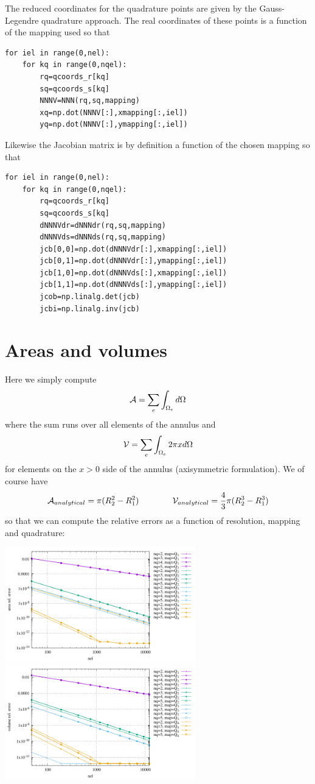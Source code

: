 The reduced coordinates for the quadrature points are given by 
the Gauss-Legendre quadrature approach. The real coordinates of these points
is a function of the mapping used so that 
\begin{lstlisting}
for iel in range(0,nel):
    for kq in range(0,nqel):
        rq=qcoords_r[kq]
        sq=qcoords_s[kq]
        NNNV=NNN(rq,sq,mapping)
        xq=np.dot(NNNV[:],xmapping[:,iel])
        yq=np.dot(NNNV[:],ymapping[:,iel])
\end{lstlisting}
Likewise the Jacobian matrix is by definition a function of the chosen mapping 
so that 
\begin{lstlisting}
for iel in range(0,nel):
    for kq in range(0,nqel):
        rq=qcoords_r[kq]
        sq=qcoords_s[kq]
        dNNNVdr=dNNNdr(rq,sq,mapping)
        dNNNVds=dNNNds(rq,sq,mapping)
        jcb[0,0]=np.dot(dNNNVdr[:],xmapping[:,iel])
        jcb[0,1]=np.dot(dNNNVdr[:],ymapping[:,iel])
        jcb[1,0]=np.dot(dNNNVds[:],xmapping[:,iel])
        jcb[1,1]=np.dot(dNNNVds[:],ymapping[:,iel])
        jcob=np.linalg.det(jcb)
        jcbi=np.linalg.inv(jcb)
\end{lstlisting}




\newpage
\section*{Areas and volumes}

Here we simply compute 
\[
{\cal A} = \sum_e \int_{\Omega_e} d\Omega
\]
where the sum runs over all elements of the annulus
and 
\[
{\cal V} = \sum_e \int_{\Omega_e} 2\pi x d\Omega
\]
for elements on the $x>0$ side of the annulus (axisymmetric formulation).
We of course have 
\[
{\cal A}_{analytical} = \pi (R_2^2-R_1^2)
\qquad\qquad
{\cal V}_{analytical} = \frac43 \pi (R_2^3-R_1^3)
\]
so that we can compute the relative errors as a function of resolution, mapping and quadrature: 
\begin{center}
\includegraphics[width=8.3cm]{python_codes/fieldstone_152/results/areas/areas.pdf}
\includegraphics[width=8.3cm]{python_codes/fieldstone_152/results/areas/volumes.pdf}
\end{center}

